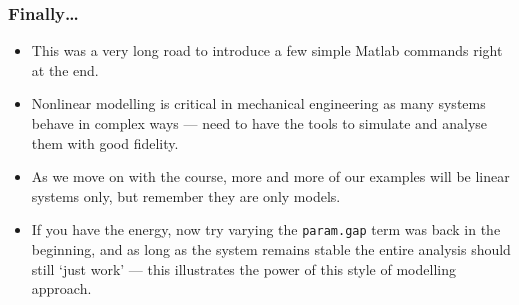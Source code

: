 \documentclass[9pt]{beamer-control}
\begin{document}
\begin{frame}
\frametitle{Finally\dots}

\begin{itemize}
\item This was a very long road to introduce a few simple Matlab commands right at the end.
\item Nonlinear modelling is critical in mechanical engineering as many systems behave in complex ways --- need to have the tools to simulate and analyse them with good fidelity.
\item As we move on with the course, more and more of our examples will be linear systems only, but remember they are only models.
\item \alert{If you have the energy, now try varying the \texttt{param.gap} term was back in the beginning, and as long as the system remains stable the entire analysis should still `just work' --- this illustrates the power of this style of modelling approach.}
\end{itemize}

\end{frame}
\end{document}
